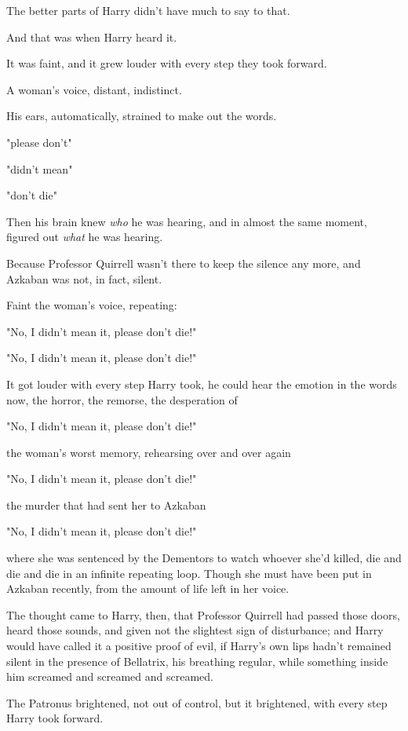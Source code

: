 The better parts of Harry didn't have much to say to that.

And that was when Harry heard it.

It was faint, and it grew louder with every step they took forward.

A woman's voice, distant, indistinct.

His ears, automatically, strained to make out the words.

"{\el}please don't{\el}"

"{\el}didn't mean{\el}"

"{\el}don't die{\el}"

Then his brain knew \emph{who} he was hearing, and in almost the same moment,
figured out \emph{what} he was hearing.

Because Professor Quirrell wasn't there to keep the silence any more, and
Azkaban was not, in fact, silent.

Faint the woman's voice, repeating:

"No, I didn't mean it, please don't die!"

"No, I didn't mean it, please don't die!"

It got louder with every step Harry took, he could hear the emotion in the
words now, the horror, the remorse, the desperation of{\el}

"No, I didn't mean it, please don't die!"

{\el} the woman's worst memory, rehearsing over and over again{\el}

"No, I didn't mean it, please don't die!"

{\el} the murder that had sent her to Azkaban{\el}

"No, I didn't mean it, please don't die!"

{\el} where she was sentenced by the Dementors to watch whoever she'd killed,
die and die and die in an infinite repeating loop. Though she must have been
put in Azkaban recently, from the amount of life left in her voice.

The thought came to Harry, then, that Professor Quirrell had passed those
doors, heard those sounds, and given not the slightest sign of disturbance; and
Harry would have called it a positive proof of evil, if Harry's own lips hadn't
remained silent in the presence of Bellatrix, his breathing regular, while
something inside him screamed and screamed and screamed.

The Patronus brightened, not out of control, but it brightened, with every step
Harry took forward.

